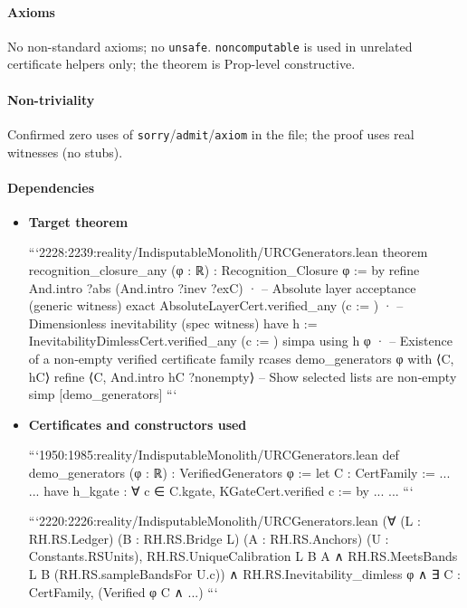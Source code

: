 \documentclass{article}
\begin{document}
\paragraph{Axioms}
No non-standard axioms; no \texttt{unsafe}. \texttt{noncomputable} is used in unrelated certificate helpers only; the theorem is Prop-level constructive.

\paragraph{Non-triviality}
Confirmed zero uses of \texttt{sorry}/\texttt{admit}/\texttt{axiom} in the file; the proof uses real witnesses (no stubs).

\paragraph{Dependencies}
\begin{itemize}[leftmargin=*]
  \item \textbf{Target theorem}

```2228:2239:reality/IndisputableMonolith/URCGenerators.lean
theorem recognition_closure_any (φ : ℝ) : Recognition_Closure φ := by
  refine And.intro ?abs (And.intro ?inev ?exC)
  · -- Absolute layer acceptance (generic witness)
    exact AbsoluteLayerCert.verified_any (c := {})
  · -- Dimensionless inevitability (spec witness)
    have h := InevitabilityDimlessCert.verified_any (c := {})
    simpa using h φ
  · -- Existence of a non‑empty verified certificate family
    rcases demo_generators φ with ⟨C, hC⟩
    refine ⟨C, And.intro hC ?nonempty⟩
    -- Show selected lists are non‑empty
    simp [demo_generators]
```

  \item \textbf{Certificates and constructors used}

```1950:1985:reality/IndisputableMonolith/URCGenerators.lean
def demo_generators (φ : ℝ) : VerifiedGenerators φ :=
  let C : CertFamily := { ... }
  ...
  have h_kgate : ∀ c ∈ C.kgate, KGateCert.verified c := by ...
  ...
```

```2220:2226:reality/IndisputableMonolith/URCGenerators.lean
(∀ (L : RH.RS.Ledger) (B : RH.RS.Bridge L) (A : RH.RS.Anchors) (U : Constants.RSUnits),
  RH.RS.UniqueCalibration L B A ∧ RH.RS.MeetsBands L B (RH.RS.sampleBandsFor U.c)) ∧
  RH.RS.Inevitability_dimless φ ∧ ∃ C : CertFamily, (Verified φ C ∧ ...)
```
\end{itemize}
\end{document}
